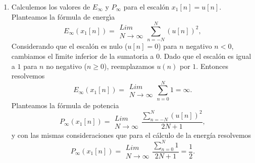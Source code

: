 \begin{enumerate}

\item Calculemos los valores de $E_{\infty }$ y $P_{\infty }$ para 
el escal\'{o}n $x_{1}\left[ n\right] =u[n]$.
Planteamos la f\'{o}rmula de energ\'{\i}a
  \begin{equation}
    E_{\infty }\left( x_{1}\left[ n\right] \right) = 
    \begin{array}{c}
      Lim \\ 
      N\rightarrow \infty
    \end{array}
    \sum_{n=-N}^{N}\left( u\left[ n\right] \right) ^{2},
  \end{equation}
Considerando que el escal\'{o}n es nulo ($u[n] = 0$) para $n$ negativo
$n < 0$, cambiamos el l\'{\i}mite inferior de la sumatoria a $0$. Dado
que el escal\'{o}n es igual a $1$ para $n$ no negativo ($n \geq 0$), reemplazamos $u(n)$
por $1$. Entonces resolvemos 
  \begin{equation}
    E_{\infty }\left( x_{1}\left[ n\right] \right) = 
    \begin{array}{c}
      Lim \\ 
      N\rightarrow \infty
    \end{array}
    \sum_{n=0}^{N} 1 =\infty.
  \end{equation}
Planteamos la f\'{o}rmula de potencia
  \begin{equation}
    P_{\infty }\left( x_{1}\left[ n\right] \right) = 
    \begin{array}{c}
      Lim \\ 
      N\rightarrow \infty
    \end{array}
    \frac{\sum_{n=-N}^{N}\left( u\left[ n\right] \right) ^{2}}{2N+1},
  \end{equation}
y con las mismas consideraciones que para el c\'{a}lculo de la
energ\'{i}a resolvemos
  \begin{equation}
    P_{\infty }\left( x_{1}\left[ n\right] \right) = 
    \begin{array}{c}
      Lim \\ 
      N\rightarrow \infty
    \end{array}
    \frac{\sum_{n=0}^{N}1}{2N+1}=\frac{1}{2}.
  \end{equation}


\end{enumerate}
